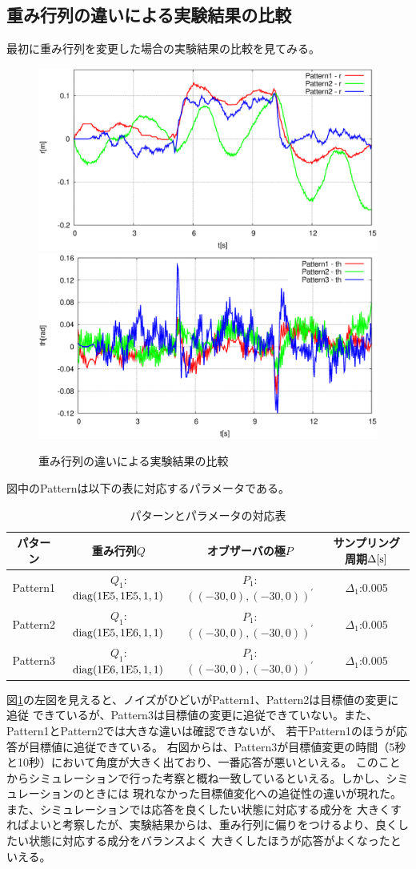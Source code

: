 	\subsection{重み行列の違いによる実験結果の比較}
	最初に重み行列を変更した場合の実験結果の比較を見てみる。
	\begin{figure}[H]
		\centering
		\includegraphics[width=0.49\linewidth]{gazo/Compare_Q_R.eps}
		\includegraphics[width=0.49\linewidth]{gazo/Compare_Q_TH.eps}
		\caption{重み行列の違いによる実験結果の比較}
		\label{image:comp_Q}
	\end{figure}
	図中のPatternは以下の表に対応するパラメータである。
	\begin{table}[H]
		\begin{center}
			\caption{パターンとパラメータの対応表}
			\medskip
			
			\begin{tabular}{|c|c|c|c|}\hline
				パターン & 重み行列$Q$ & オブザーバの極$P$ & サンプリング周期$\Delta[\rm{s}]$ \\ \hline\hline
				Pattern1 & $Q_1$:$\rm{diag}(1E5,1E5,1,1)$ & $P_1$:$((-30,0),(-30,0))^{'}$ & $\Delta_1$:0.005 \\ \hline
				Pattern2 & $Q_1$:$\rm{diag}(1E5,1E6,1,1)$ & $P_1$:$((-30,0),(-30,0))^{'}$ & $\Delta_1$:0.005 \\ \hline
				Pattern3 & $Q_1$:$\rm{diag}(1E6,1E5,1,1)$ & $P_1$:$((-30,0),(-30,0))^{'}$ & $\Delta_1$:0.005 \\ \hline
			\end{tabular}
		\end{center}
		\label{table:huriage_control}
	\end{table}
	図\ref{image:comp_Q}の左図を見えると、ノイズがひどいがPattern1、Pattern2は目標値の変更に追従
	できているが、Pattern3は目標値の変更に追従できていない。また、Pattern1とPattern2では大きな違いは確認できないが、
	若干Pattern1のほうが応答が目標値に追従できている。
	右図からは、Pattern3が目標値変更の時間（5秒と10秒）において角度が大きく出ており、一番応答が悪いといえる。
	このことからシミュレーションで行った考察と概ね一致しているといえる。しかし、シミュレーションのときには
	現れなかった目標値変化への追従性の違いが現れた。また、シミュレーションでは応答を良くしたい状態に対応する成分を
	大きくすればよいと考察したが、実験結果からは、重み行列に偏りをつけるより、良くしたい状態に対応する成分をバランスよく
	大きくしたほうが応答がよくなったといえる。
	\par
